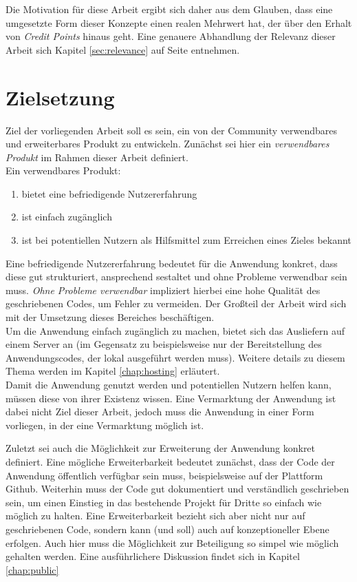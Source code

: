 Die Motivation für diese Arbeit ergibt sich daher aus dem Glauben, dass eine umgesetzte Form dieser Konzepte einen realen Mehrwert hat, der über den Erhalt von \textit{Credit Points} hinaus geht.
Eine genauere Abhandlung der Relevanz dieser Arbeit sich Kapitel \ref{sec:relevance} auf Seite entnehmen.

\section{Zielsetzung}
\label{chap:goal}
Ziel der vorliegenden Arbeit soll es sein, ein von der Community verwendbares und erweiterbares Produkt zu entwickeln. Zunächst sei hier ein \textit{verwendbares Produkt} im Rahmen dieser Arbeit definiert.\\
Ein verwendbares Produkt:

\begin{enumerate}
  \item bietet eine befriedigende Nutzererfahrung
  \item ist einfach zugänglich
  \item ist bei potentiellen Nutzern als Hilfsmittel zum Erreichen eines Zieles bekannt
\end{enumerate}

Eine befriedigende Nutzererfahrung bedeutet für die Anwendung konkret, dass diese gut strukturiert, ansprechend sestaltet und ohne Probleme verwendbar sein muss. \textit{Ohne Probleme verwendbar} impliziert hierbei eine hohe Qualität des geschriebenen Codes, um Fehler zu vermeiden. Der Großteil der Arbeit wird sich mit der Umsetzung dieses Bereiches beschäftigen.\\
Um die Anwendung einfach zugänglich zu machen, bietet sich das Ausliefern auf einem Server an (im Gegensatz zu beispielsweise nur der Bereitstellung des Anwendungscodes, der lokal ausgeführt werden muss). Weitere details zu diesem Thema werden im Kapitel \ref{chap:hosting} erläutert.\\
Damit die Anwendung genutzt werden und potentiellen Nutzern helfen kann, müssen diese von ihrer Existenz wissen. Eine Vermarktung der Anwendung ist dabei nicht Ziel dieser Arbeit, jedoch muss die Anwendung in einer Form vorliegen, in der eine Vermarktung möglich ist.

Zuletzt sei auch die Möglichkeit zur Erweiterung der Anwendung konkret definiert. Eine mögliche Erweiterbarkeit bedeutet zunächst, dass der Code der Anwendung öffentlich verfügbar sein muss, beispielsweise auf der Plattform Github\footnotemark{}. Weiterhin muss der Code gut dokumentiert und verständlich geschrieben sein, um einen Einstieg in das bestehende Projekt für Dritte so einfach wie möglich zu halten. Eine Erweiterbarkeit bezieht sich aber nicht nur auf geschriebenen Code, sondern kann (und soll) auch auf konzeptioneller Ebene erfolgen. Auch hier muss die Möglichkeit zur Beteiligung so simpel wie möglich gehalten werden. Eine ausführlichere Diskussion findet sich in Kapitel \ref{chap:public}\\

